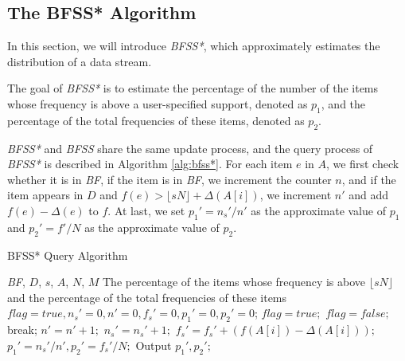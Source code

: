 \documentclass[conference]{IEEEtran}
\begin{document}
\subsection{The BFSS* Algorithm}
In this section, we will introduce \emph{BFSS*}, which approximately estimates the distribution of a data stream.\par
The goal of \emph{BFSS*} is to estimate the percentage of the number of the items whose frequency is above a user-specified support, denoted as $p_1$, and the percentage of the total frequencies of these items, denoted as $p_2$.\par 
\emph{BFSS*} and \emph{BFSS} share the same update process, and the query process of \emph{BFSS*} is described in Algorithm \ref{alg:bfss*}. For each item $e$ in $A$, we first check whether it is in \emph{BF}, if the item is in \emph{BF}, we increment the counter $n$, and if the item appears in $D$ and $f(e)>\lfloor sN\rfloor+\Delta(A[i])$, we increment $n'$ and add $f(e)-\Delta(e)$ to $f$. At last, we set $p_1'=n_s'/n'$ as the approximate value of $p_1$ and $p_2'=f'/N$ as the approximate value of $p_2$.

\begin{algorithm}[h]
	\caption{BFSS* Query Algorithm}
	\label{alg:bfss*}
	\begin{algorithmic}[1]
		\REQUIRE \emph{BF}, $D$, $s$, $A$, $N$, $M$
		\ENSURE The percentage of the items whose frequency is above $\lfloor s
		N\rfloor$ and the percentage of the total frequencies of these items
	    \STATE $flag=true,n_s'=0,n'=0,f_s'=0,p_1'=0,p_2'=0$;
    	\STATE $flag=true;$
	    \STATE $flag=false;$
	    \STATE break;
	    \ENDIF
	    \ENDFOR
	    \STATE $n'=n'+1;$
	    \STATE $n_s'=n_s'+1;$
	    \STATE $f_s'=f_s'+(f(A[i])-\Delta(A[i]));$
	    \ENDIF
	    \ENDIF
	    \ENDIF
	    \ENDFOR
	    \STATE $p_1'=n_s'/n',p_2'=f_s'/N;$
	    \STATE Output $p_1',p_2';$
	\end{algorithmic}
\end{algorithm}
\end{document}
